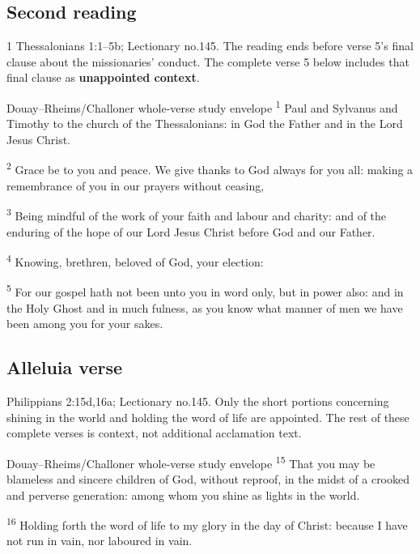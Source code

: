 \subsection{Second reading}
\label{proper-second-reading}
1 Thessalonians 1:1--5b; Lectionary no.145. The reading ends before verse 5's final clause about the missionaries' conduct. The complete verse 5 below includes that final clause as \textbf{unappointed context}.
\begin{englishwitness}{Douay--Rheims/Challoner whole-verse study envelope}
\textsuperscript{1} Paul and Sylvanus and Timothy to the church of the Thessalonians: in God the Father and in the Lord Jesus Christ.

\textsuperscript{2} Grace be to you and peace. We give thanks to God always for you all: making a remembrance of you in our prayers without ceasing,

\textsuperscript{3} Being mindful of the work of your faith and labour and charity: and of the enduring of the hope of our Lord Jesus Christ before God and our Father.

\textsuperscript{4} Knowing, brethren, beloved of God, your election:

\textsuperscript{5} For our gospel hath not been unto you in word only, but in power also: and in the Holy Ghost and in much fulness, as you know what manner of men we have been among you for your sakes.
\end{englishwitness}

\subsection{Alleluia verse}
\label{proper-acclamation}
Philippians 2:15d,16a; Lectionary no.145. Only the short portions concerning shining in the world and holding the word of life are appointed. The rest of these complete verses is context, not additional acclamation text.
\begin{englishwitness}{Douay--Rheims/Challoner whole-verse study envelope}
\textsuperscript{15} That you may be blameless and sincere children of God, without reproof, in the midst of a crooked and perverse generation: among whom you shine as lights in the world.

\textsuperscript{16} Holding forth the word of life to my glory in the day of Christ: because I have not run in vain, nor laboured in vain.
\end{englishwitness}

